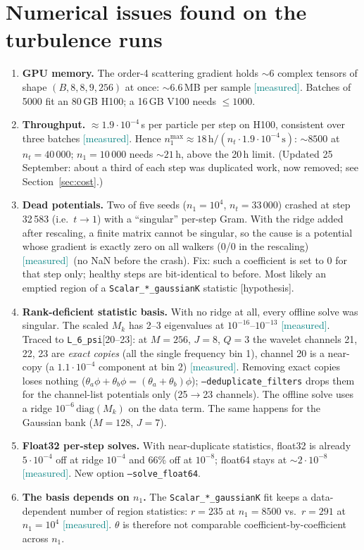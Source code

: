 \documentclass[11pt,a4paper]{article}
\newcommand{\code}[1]{\texttt{#1}}
\newcommand{\meas}{\textcolor{teal}{\textsf{[measured]}}}
\newcommand{\hyp}{\textcolor{orange!80!black}{\textsf{[hypothesis]}}}
\begin{document}
\section{Numerical issues found on the turbulence runs}
\begin{enumerate}
  \item \textbf{GPU memory.} The order-4 scattering gradient holds $\sim6$ complex tensors of
        shape $(B,8,8,9,256)$ at once: $\sim6.6$\,MB per sample \meas. Batches of 5000 fit
        an 80\,GB H100; a 16\,GB V100 needs $\le1000$.
  \item \textbf{Throughput.} $\approx1.9\cdot10^{-4}$\,s per particle per step on H100,
        consistent over three batches \meas. Hence $n_1^{\max}\approx 18\,\mathrm h/(n_t\cdot1.9\cdot10^{-4}\,\mathrm s)$:
        $\sim8500$ at $n_t=40\,000$; $n_1=10\,000$ needs $\sim21$\,h, above the 20\,h limit.
        (Updated 25 September: about a third of each step was duplicated work, now removed;
        see Section~\ref{sec:cost}.)
  \item \textbf{Dead potentials.} Two of five seeds ($n_1=10^4$, $n_t=33\,000$) crashed at
        step 32\,583 (i.e.\ $t\to1$) with a ``singular'' per-step Gram. With the ridge added after
        rescaling, a finite matrix cannot be singular, so the cause is a potential whose gradient is exactly
        zero on all walkers (0/0 in the rescaling) \meas\ (no NaN before the crash). Fix: such a
        coefficient is set to 0 for that step only; healthy steps are bit-identical to before.
        Most likely an emptied region of a \code{Scalar\_*\_gaussianK} statistic \hyp.
  \item \textbf{Rank-deficient statistic basis.} With no ridge at all, every offline solve was
        singular. The scaled $M_k$ has 2--3 eigenvalues at $10^{-16}$--$10^{-13}$ \meas. Traced to
        \code{L\_6\_psi}[20--23]: at $M=256$, $J=8$, $Q=3$ the wavelet channels 21, 22, 23 are
        \emph{exact copies} (all the single frequency bin 1), channel 20 is a near-copy (a
        $1.1\cdot10^{-4}$ component at bin 2) \meas. Removing exact copies loses nothing
        ($\theta_a\phi+\theta_b\phi=(\theta_a+\theta_b)\phi$); \code{--deduplicate\_filters} drops them
        for the channel-list potentials only (25$\to$23 channels). The offline solve uses a ridge
        $10^{-6}\,\mathrm{diag}(M_k)$ on the data term. The same happens for the Gaussian bank ($M=128$, $J=7$).
  \item \textbf{Float32 per-step solves.} With near-duplicate statistics, float32 is already
        $5\cdot10^{-4}$ off at ridge $10^{-4}$ and 66\% off at $10^{-8}$; float64 stays at
        $\sim2\cdot10^{-8}$ \meas. New option \code{--solve\_float64}.
  \item \textbf{The basis depends on $n_1$.} The \code{Scalar\_*\_gaussianK} fit keeps a
        data-dependent number of region statistics: $r=235$ at $n_1=8500$ vs.\ $r=291$ at
        $n_1=10^4$ \meas. $\theta$ is therefore not comparable coefficient-by-coefficient across $n_1$.
\end{enumerate}
\end{document}
